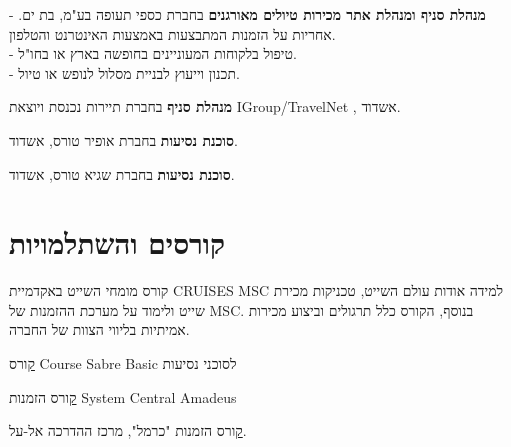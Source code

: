 {\textbf{מנהלת סניף ומנהלת אתר מכירות טיולים מאורגנים }בחברת כספי תעופה בע"מ, בת ים.}
{
- אחריות על הזמנות המתבצעות באמצעות האינטרנט והטלפון.\\
- טיפול בלקוחות המעוניינים בחופשה בארץ או בחו"ל.\\
- תכנון וייעוץ לבניית מסלול לנופש או טיול.
}
{}

{\textbf{מנהלת סניף} בחברת תיירות נכנסת ויוצאת
	\setLTR IGroup/TravelNet \unsetLTR, אשדוד.}
{}
{}

{\textbf{סוכנת נסיעות} בחברת אופיר טורס, אשדוד.}
{}
{}

{\textbf{סוכנת נסיעות} בחברת שגיא טורס, אשדוד.}
{}
{}


	 

\section{קורסים והשתלמויות}

{קורס מומחי השייט באקדמיית CRUISES MSC}
{למידה אודות עולם השייט, טכניקות מכירת שייט ולימוד על מערכת ההזמנות של MSC.}
{בנוסף, הקורס כלל תרגולים וביצוע מכירות אמיתיות בליווי הצוות של החברה.}

{\href{https://loona-il.000webhostapp.com/resume-references-mom/basic-sabre-course.jpg}
	קורס Course Sabre Basic לסוכני נסיעות}
{}
{}

{\href{https://loona-il.000webhostapp.com/resume-references-mom/amadeus-central-system.jpg}
קורס הזמנות
System Central Amadeus
}
{}
{}

{\href{https://loona-il.000webhostapp.com/resume-references-mom/el-al-carmel.jpg}קורס הזמנות "כרמל", מרכז ההדרכה אל-על.}
{}
{}


